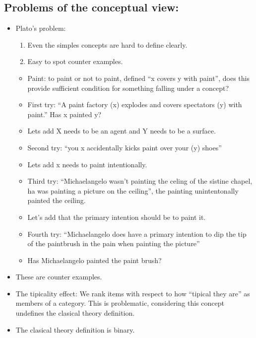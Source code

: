 \subsection{Problems of the conceptual view:}
\begin{itemize}
    \item Plato's problem: 
        \begin{enumerate}
            \item Even the simples concepts are hard to define clearly. 
            \item Easy to spot counter examples.
        \end{enumerate}
        \begin{itemize}
            \item Paint: to paint or not to paint, defined ``x covers y with paint'', does this provide sufficient condition for something falling under a concept? 
            \item First try: ``A paint factory (x) explodes and covers spectators (y) with paint.'' Has x painted y?
            \item Lets add X needs to be an agent and Y needs to be a surface.
            \item Second try: ``you x accidentally kicks paint over your (y) shoes''
            \item Lets add x needs to paint intentionally.
            \item Third try: ``Michaelangelo wasn't painting the celing of the sistine chapel, ha was painting a picture on the ceiling'', the painting unintentonally painted the ceiling.
            \item Let's add that the primary intention should be to paint it.
            \item Fourth try: ``Michaelangelo does have a primary intention to dip the tip of the paintbrush in the pain when painting the picture''
            \item Has Michaelangelo painted the paint brush?
        \end{itemize}
    
    \item These are counter examples.
    \item The tipicality effect: We rank items with respect to how ``tipical they are'' as members of a category. This is problematic, considering this  concept undefines the clasical theory definition.
    \item The clasical theory definition is binary.
\end{itemize}



